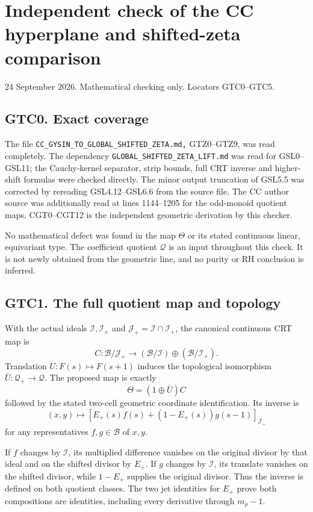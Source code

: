 \section{Independent check of the CC hyperplane and shifted-zeta
comparison}\label{independent-check-of-the-cc-hyperplane-and-shifted-zeta-comparison}

24 September 2026. Mathematical checking only. Locators GTC0--GTC5.

\subsection{GTC0. Exact coverage}\label{gtc0.-exact-coverage}

The file \nolinkurl{CC_GYSIN_TO_GLOBAL_SHIFTED_ZETA.md,} GTZ0--GTZ9, was
read completely. The dependency \nolinkurl{GLOBAL_SHIFTED_ZETA_LIFT.md}
was read for GSL0--GSL11; the Cauchy-kernel separator, strip bounds,
full CRT inverse and higher-shift formulas were checked directly. The
minor output truncation of GSL5.5 was corrected by rereading
GSL4.12--GSL6.6 from the source file. The CC author source was
additionally read at lines 1144--1205 for the odd-monoid quotient maps.
CGT0--CGT12 is the independent geometric derivation by this checker.

No mathematical defect was found in the map \(\Theta\) or its stated
continuous linear, equivariant type. The coefficient quotient
\(\mathcal Q\) is an input throughout this check. It is not newly
obtained from the geometric line, and no purity or RH conclusion is
inferred.

\subsection{GTC1. The full quotient map and
topology}\label{gtc1.-the-full-quotient-map-and-topology}

With the actual ideals \(\mathcal I,\mathcal I_+\) and
\(\mathcal J_+=\mathcal I\cap\mathcal I_+\), the canonical continuous
CRT map is \[
C:\mathcal B/\mathcal J_+\to
(\mathcal B/\mathcal I)\oplus(\mathcal B/\mathcal I_+).
\] Translation \(U:F(s)\mapsto F(s+1)\) induces the topological
isomorphism \(\bar U:\mathcal Q_+\to\mathcal Q\). The proposed map is
exactly \[
\Theta=(1\oplus\bar U)C
\] followed by the stated two-cell geometric coordinate identification.
Its inverse is \[
(x,y)\mapsto
[E_+(s)f(s)+(1-E_+(s))g(s-1)]_{\mathcal J_+}
\] for any representatives \(f,g\in\mathcal B\) of \(x,y\).

If \(f\) changes by \(\mathcal I\), its multiplied difference vanishes
on the original divisor by that ideal and on the shifted divisor by
\(E_+\). If \(g\) changes by \(\mathcal I\), its translate vanishes on
the shifted divisor, while \(1-E_+\) supplies the original divisor. Thus
the inverse is defined on both quotient classes. The two jet identities
for \(E_+\) prove both compositions are identities, including every
derivative through \(m_\rho-1\).

